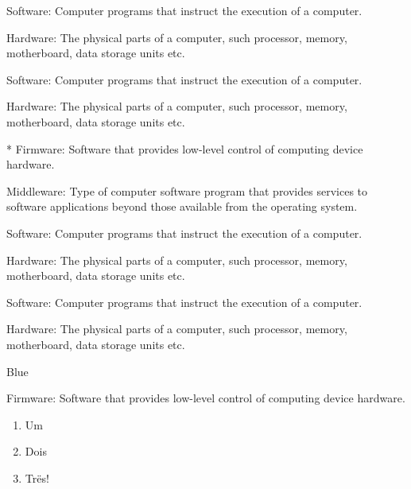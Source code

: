 \documentclass[a4paper, 11pt]{article}
\begin{document}
\begin{PLTEnumerate}
    \item Software: Computer programs that instruct the execution of a computer.
    \item Hardware: The physical parts of a computer, such processor, memory, motherboard, data storage units etc.
    \begin{PLTEnumerate}
        \item Software: Computer programs that instruct the execution of a computer.
        \item Hardware: The physical parts of a computer, such processor, memory, motherboard, data storage units etc.
    \end{PLTEnumerate}
    \item [*]Firmware: Software that provides low-level control of computing device hardware.
    \item Middleware: Type of computer software program that provides services to software applications beyond those available from the operating system.
\end{PLTEnumerate}

\bigskip

\begin{PLTEnumerate}
    \item Software: Computer programs that instruct the execution of a computer.
    \item Hardware: The physical parts of a computer, such processor, memory, motherboard, data storage units etc.
    \begin{PLTEnumerate}
        \item Software: Computer programs that instruct the execution of a computer.
        \item Hardware: The physical parts of a computer, such processor, memory, motherboard, data storage units etc.
        \item Blue
    \end{PLTEnumerate}
    \item Firmware: Software that provides low-level control of computing device hardware.
\end{PLTEnumerate}


\begin{enumerate}
    \item Um
    \item Dois
    \item Trës!
\end{enumerate}
\end{document}
